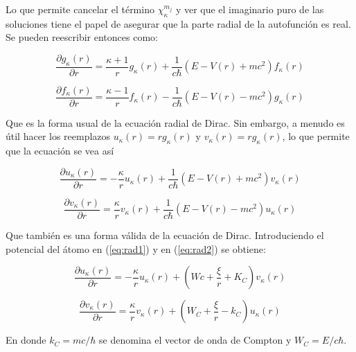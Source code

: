 \documentclass[a4paper, 12pt]{article} %
\begin{document}
Lo que permite cancelar el t\'ermino $\chi^{m_j}_{\kappa}$ y ver que el 
imaginario puro de las soluciones tiene el papel de asegurar que la parte 
radial de la autofunci\'on es real. Se pueden reescribir entonces como:


\begin{equation}
\frac{\partial g_{\kappa}(r)}{\partial r} =\frac{\kappa+1}{r}g_{\kappa}(r)+\frac{1}{c\hbar}(E-V(r)+mc^2)f_{\kappa}(r)
\end{equation}

\begin{equation}
\frac{\partial f_{\kappa}(r)}{\partial r} =\frac{\kappa-1}{r}f_{\kappa}(r)-\frac{1}{c\hbar}(E-V(r)-mc^2)g_{\kappa}(r)
\end{equation}

Que es la forma usual de la ecuaci\'on radial de Dirac. Sin embargo, a menudo es \'util hacer los reemplazos $u_{\kappa}(r)=rg_{\kappa}(r)$ y $v_{\kappa}(r)=rg_{\kappa}(r)$, lo que permite que la ecuaci\'on se vea as\'i


\begin{equation}\label{eq:rad1}
\frac{\partial u_{\kappa}(r)}{\partial r} =-\frac{\kappa}{r}u_{\kappa}(r)+\frac{1}{c\hbar}(E-V(r)+mc^2)v_{\kappa}(r)
\end{equation}

\begin{equation}\label{eq:rad2}
\frac{\partial v_{\kappa}(r)}{\partial r} =\frac{\kappa}{r}v_{\kappa}(r)+\frac{1}{c\hbar}(E-V(r)-mc^2)u_{\kappa}(r)
\end{equation}

Que tambi\'en es una forma v\'alida de la ecuaci\'on de Dirac. Introduciendo 
el potencial del \'atomo en (\ref{eq:rad1}) y en (\ref{eq:rad2}) se 
obtiene:

\begin{equation}\label{eq:Hrad1}
\dfrac{\partial u_{\kappa}(r)}{\partial r} =-\dfrac{\kappa}{r}u_{\kappa}(r)+\left ( Wc+\dfrac{\xi}{r}+K_C \right ) v_{\kappa}(r)
\end{equation}

\begin{equation}\label{eq:Hrad2}
\dfrac{\partial v_{\kappa}(r)}{\partial r} =\dfrac{\kappa}{r}v_{\kappa}(r)+
\left ( W_C + \dfrac{\xi}{r} - k_C \right )u_{\kappa}(r)
\end{equation}

En donde $k_C = mc/\hbar$ se denomina el vector de onda de Compton y 
$W_C = E / c\hbar$.

\end{document}
